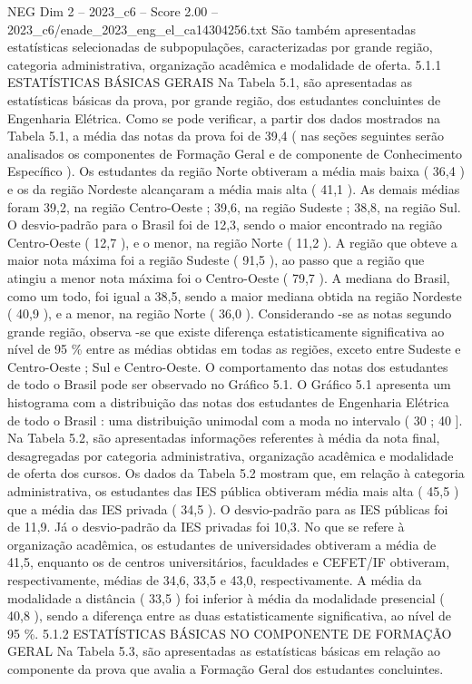 \begin{textsample}{NEG Dim 2 – 2023\_c6 – Score 2.00 – 2023\_c6/enade\_2023\_eng\_el\_ca14304256.txt}
São também apresentadas estatísticas selecionadas de subpopulações, caracterizadas por grande região, categoria administrativa, organização acadêmica e modalidade de oferta. 5.1.1 ESTATÍSTICAS BÁSICAS GERAIS Na Tabela 5.1, são apresentadas as estatísticas básicas da prova, por grande região, dos estudantes concluintes de Engenharia Elétrica.
Como se pode verificar, a partir dos dados mostrados na Tabela 5.1, a média das notas da prova foi de 39,4 ( nas seções seguintes serão analisados os componentes de Formação Geral e de componente de Conhecimento Específico ).
Os estudantes da região Norte obtiveram a média mais baixa ( 36,4 ) e os da região Nordeste alcançaram a média mais alta ( 41,1 ).
As demais médias foram 39,2, na região Centro-Oeste ; 39,6, na região Sudeste ; 38,8, na região Sul.
O desvio-padrão para o Brasil foi de 12,3, sendo o maior encontrado na região Centro-Oeste ( 12,7 ), e o menor, na região Norte ( 11,2 ).
A região que obteve a maior nota máxima foi a região Sudeste ( 91,5 ), ao passo que a região que atingiu a menor nota máxima foi o Centro-Oeste ( 79,7 ).
A mediana do Brasil, como um todo, foi igual a 38,5, sendo a maior mediana obtida na região Nordeste ( 40,9 ), e a menor, na região Norte ( 36,0 ).
Considerando -se as notas segundo grande região, observa -se que existe diferença estatisticamente significativa ao nível de 95 \% entre as médias obtidas em todas as regiões, exceto entre Sudeste e Centro-Oeste ; Sul e Centro-Oeste.
O comportamento das notas dos estudantes de todo o Brasil pode ser observado no Gráfico 5.1.
O Gráfico 5.1 apresenta um histograma com a distribuição das notas dos estudantes de Engenharia Elétrica de todo o Brasil : uma distribuição unimodal com a moda no intervalo ( 30 ; 40 ].
Na Tabela 5.2, são apresentadas informações referentes à média da nota final, desagregadas por categoria administrativa, organização acadêmica e modalidade de oferta dos cursos.
Os dados da Tabela 5.2 mostram que, em relação à categoria administrativa, os estudantes das IES pública obtiveram média mais alta ( 45,5 ) que a média das IES privada ( 34,5 ).
O desvio-padrão para as IES públicas foi de 11,9.
Já o desvio-padrão da IES privadas foi 10,3.
No que se refere à organização acadêmica, os estudantes de universidades obtiveram a média de 41,5, enquanto os de centros universitários, faculdades e CEFET/IF obtiveram, respectivamente, médias de 34,6, 33,5 e 43,0, respectivamente.
A média da modalidade a distância ( 33,5 ) foi inferior à média da modalidade presencial ( 40,8 ), sendo a diferença entre as duas estatisticamente significativa, ao nível de 95 \%. 5.1.2 ESTATÍSTICAS BÁSICAS NO COMPONENTE DE FORMAÇÃO GERAL Na Tabela 5.3, são apresentadas as estatísticas básicas em relação ao componente da prova que avalia a Formação Geral dos estudantes concluintes.

\end{textsample}
